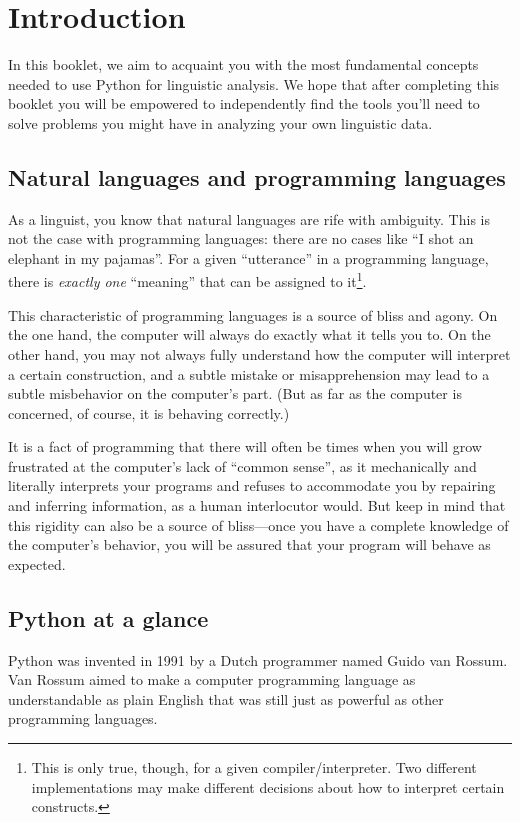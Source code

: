 \documentclass{article}
\let\oldsection\section
\renewcommand\section{\clearpage\oldsection}
\begin{document}
\clearpage
\tableofcontents
\pagebreak


\section{Introduction}

In this booklet, we aim to acquaint you with the most fundamental concepts needed to use Python for linguistic analysis. We hope that after completing this booklet you will be empowered to independently find the tools you'll need to solve problems you might have in analyzing your own linguistic data.

\subsection{Natural languages and programming languages}

As a linguist, you know that natural languages are rife with ambiguity. This is not the case with programming languages: there are no cases like ``I shot an elephant in my pajamas''. For a given ``utterance'' in a programming language, there is \emph{exactly one} ``meaning'' that can be assigned to it\footnote{This is only true, though, for a given compiler/interpreter. Two different implementations may make different decisions about how to interpret certain constructs.}. 

This characteristic of programming languages is a source of bliss and agony. On the one hand, the computer will always do exactly what it tells you to. On the other hand, you may not always fully understand how the computer will interpret a certain construction, and a subtle mistake or misapprehension may lead to a subtle misbehavior on the computer's part. (But as far as the computer is concerned, of course, it is behaving correctly.)

It is a fact of programming that there will often be times when you will grow frustrated at the computer's lack of ``common sense'', as it mechanically and literally interprets your programs and refuses to accommodate you by repairing and inferring information, as a human interlocutor would. But keep in mind that this rigidity can also be a source of bliss---once you have a complete knowledge of the computer's behavior, you will be assured that your program will behave as expected.


\subsection{Python at a glance}
Python was invented in 1991 by a Dutch programmer named Guido van Rossum. Van Rossum aimed to make a computer programming language as understandable as plain English that was still just as powerful as other programming languages. 
\end{document}
